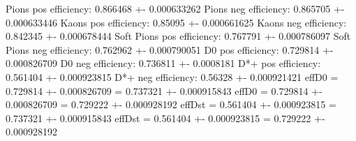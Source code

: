 Pions pos efficiency: 0.866468 +- 0.000633262
Pions neg efficiency: 0.865705 +- 0.000633446
Kaons pos efficiency: 0.85095 +- 0.000661625
Kaons neg efficiency: 0.842345 +- 0.000678444
Soft Pions pos efficiency: 0.767791 +- 0.000786097
Soft Pions neg efficiency: 0.762962 +- 0.000790051
D0 pos efficiency: 0.729814 +- 0.000826709
D0 neg efficiency: 0.736811 +- 0.0008181
D*+ pos efficiency: 0.561404 +- 0.000923815
D*+ neg efficiency: 0.56328 +- 0.000921421
effD0 = 0.729814 +- 0.000826709 = 0.737321 +- 0.000915843
effD0 = 0.729814 +- 0.000826709 = 0.729222 +- 0.000928192
effDst = 0.561404 +- 0.000923815 = 0.737321 +- 0.000915843
effDst = 0.561404 +- 0.000923815 = 0.729222 +- 0.000928192
